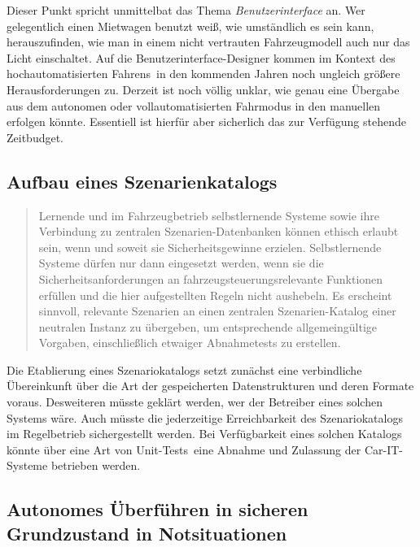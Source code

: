 \documentclass[twoside,a4paper,12pt]{article}
\begin{document}
Dieser Punkt spricht unmittelbat das Thema \textit{Benutzerinterface} an. Wer gelegentlich einen Mietwagen benutzt weiß, wie 
umständlich es sein kann, herauszufinden, wie man in einem nicht vertrauten Fahrzeugmodell auch nur das Licht einschaltet. Auf die
Benutzerinterface-Designer kommen im Kontext des \glqq hochautomatisierten Fahrens\grqq\ in den kommenden Jahren noch ungleich größere
Herausforderungen zu. Derzeit ist noch völlig unklar, wie genau eine Übergabe aus dem autonomen oder vollautomatisierten Fahrmodus in den 
manuellen erfolgen könnte. Essentiell ist hierfür aber sicherlich das zur Verfügung stehende Zeitbudget.\\

\subsection{Aufbau eines Szenarienkatalogs} \label{AufbauEinesSzenarienkatalogs}

\begin{quote}
\glqq
Lernende und im Fahrzeugbetrieb selbstlernende Systeme sowie ihre Verbindung zu zentralen Szenarien-Datenbanken 
können ethisch erlaubt sein, wenn und soweit sie Sicherheitsgewinne erzielen. Selbstlernende Systeme dürfen nur dann eingesetzt werden, wenn
sie die Sicherheitsanforderungen an fahrzeugsteuerungsrelevante Funktionen erfüllen
und die hier aufgestellten Regeln nicht aushebeln. Es erscheint sinnvoll, relevante Szenarien an einen zentralen 
Szenarien-Katalog einer neutralen Instanz zu übergeben, um
entsprechende allgemeingültige Vorgaben, einschließlich etwaiger Abnahmetests zu erstellen.\grqq\mbox{~\cite[S. 13]{ek}}
\end{quote}

Die Etablierung eines Szenariokatalogs setzt zunächst eine verbindliche Übereinkunft über die Art der gespeicherten Datenstrukturen und deren Formate
voraus. Desweiteren müsste geklärt werden, wer der Betreiber eines solchen Systems wäre.  Auch müsste die jederzeitige Erreichbarkeit des Szenariokatalogs 
im Regelbetrieb sichergestellt werden. Bei Verfügbarkeit eines solchen Katalogs könnte über eine Art von \glqq Unit-Tests\grqq\ eine Abnahme und Zulassung der 
Car-IT-Systeme betrieben werden.\\

\subsection{Autonomes Überführen in sicheren Grundzustand in Notsituationen} \label{AutonomesUeberfuehrenInSicherenGrundzustandInNotsituationen}
\end{document}
